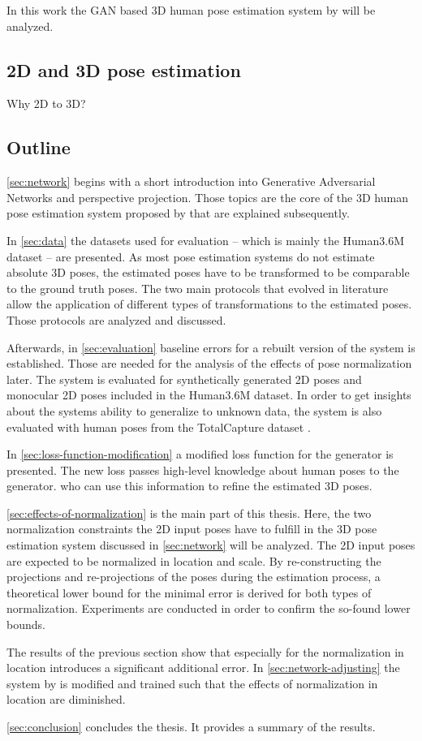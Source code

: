 In this work the GAN based 3D human pose estimation system by \citet{drover18} will be analyzed.

\subsection{2D and 3D pose estimation}
Why 2D to 3D?


\subsection{Outline}

\autoref{sec:network} begins with a short introduction into Generative Adversarial Networks and perspective projection.
Those topics are the core of the 3D human pose estimation system proposed by \citet{drover18} that are explained subsequently.

In \autoref{sec:data} the datasets used for evaluation -- which is mainly the Human3.6M dataset \cite{ionescu14} -- are presented.
As most pose estimation systems do not estimate absolute 3D poses, the estimated poses have to be transformed to be comparable to the ground truth poses.
The two main protocols that evolved in literature allow the application of different types of transformations to the estimated poses.
Those protocols are analyzed and discussed.

Afterwards, in \autoref{sec:evaluation} baseline errors for a rebuilt version of the system is established.
Those are needed for the analysis of the effects of pose normalization later.
The system is evaluated for synthetically generated 2D poses and monocular 2D poses included in the Human3.6M dataset.
In order to get insights about the systems ability to generalize to unknown data, the system is also evaluated with human poses from the TotalCapture dataset \cite{trumble17}.

In \autoref{sec:loss-function-modification} a modified loss function for the generator is presented.
The new loss passes high-level knowledge about human poses to the generator. who can use this information to refine the estimated 3D poses.

\autoref{sec:effects-of-normalization} is the main part of this thesis.
Here, the two normalization constraints the 2D input poses have to fulfill in the 3D pose estimation system discussed in \autoref{sec:network} will be analyzed.
The 2D input poses are expected to be normalized in location and scale.
By re-constructing the projections and re-projections of the poses during the estimation process, a theoretical lower bound for the minimal error is derived for both types of normalization.
Experiments are conducted in order to confirm the so-found lower bounds.

The results of the previous section show that especially for the normalization in location introduces a significant additional error.
In \autoref{sec:network-adjusting} the system by \citet{drover18} is modified and trained such that the effects of normalization in location are diminished.

\autoref{sec:conclusion} concludes the thesis. It provides a summary of the results.
